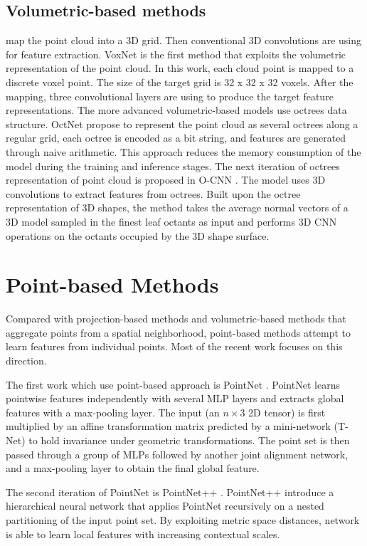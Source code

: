 \subsection{Volumetric-based methods} map the point cloud into a 3D grid. Then conventional 3D convolutions are using for feature extraction.
VoxNet \parencite{maturana_voxnet_2015} is the first method that exploits the volumetric representation of the point cloud. In this work, each cloud point is mapped to a discrete voxel point. The size of the target grid is 32 x 32 x 32 voxels. After the mapping, three convolutional layers are using to produce the target feature representations.
The more advanced volumetric-based models use octrees data structure. OctNet \parencite{riegler_octnet_2017} propose to represent the point cloud as several octrees along a regular grid, each octree is encoded as a bit string, and features are generated through naive arithmetic. This approach reduces the memory consumption of the model during the training and inference stages.
The next iteration of octrees representation of point cloud is proposed in O-CNN \parencite{wang_o-cnn_2017}. The model uses 3D convolutions to extract features from octrees. Built upon the octree representation of 3D shapes, the method takes the average normal vectors of a 3D model sampled in the finest leaf octants as input and performs 3D CNN operations on the octants occupied by the 3D shape surface.

\section{Point-based Methods}
Compared with projection-based methods and volumetric-based methods that aggregate points from a spatial neighborhood, point-based methods attempt to learn features from individual points. Most of the recent work focuses on this direction.

The first work which use point-based approach is PointNet \parencite{qi_pointnet_2017}. PointNet learns pointwise features independently with several MLP layers and extracts global features with a max-pooling layer. The input (an $n \times 3$ 2D tensor) is first multiplied by an affine transformation matrix predicted by a mini-network (T-Net) to hold invariance under geometric transformations. The point set is then passed through a group of MLPs followed by another joint alignment network, and a max-pooling layer to obtain the final global feature.

The second iteration of PointNet is PointNet++ \parencite{qi_pointnet_2017-1}. PointNet++ introduce a hierarchical neural network that applies PointNet recursively on a nested partitioning of the input point set. By exploiting metric space distances, network is able to learn local features with increasing contextual scales.

